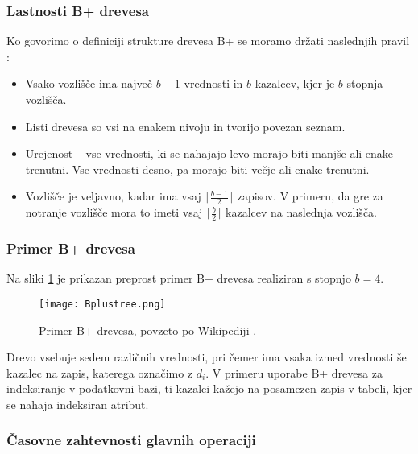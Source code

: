 \documentclass[a4paper,12pt,openright]{book}
\begin{document}
        \subsubsection{Lastnosti B+ drevesa}
        \label{btree_rules}
        Ko govorimo o definiciji strukture drevesa B+ se moramo držati naslednjih pravil \cite{goodrich2011data}:

        \begin{itemize}
            \item Vsako vozlišče ima največ $b - 1$ vrednosti in $b$ kazalcev, kjer je $b$ stopnja vozlišča.
            \item Listi drevesa so vsi na enakem nivoju in tvorijo povezan seznam.
            \item Urejenost – vse vrednosti, ki se nahajajo levo morajo biti manjše ali enake trenutni. Vse vrednosti desno, pa morajo biti večje ali enake trenutni.
            \item Vozlišče je veljavno, kadar ima vsaj $\lceil \frac{b - 1}{2}\rceil$ zapisov. V primeru, da gre za notranje vozlišče mora to imeti vsaj $\lceil \frac{b}{2} \rceil$ kazalcev na naslednja vozlišča.
        \end{itemize}
        
        \subsubsection{Primer B+ drevesa}
        Na sliki \ref{btree_example} je prikazan preprost primer B+ drevesa realiziran s stopnjo $b=4$.
        
        \begin{figure}[H]        
            \centerline{\texttt{[image: Bplustree.png]}}
            \caption{Primer B+ drevesa, povzeto po Wikipediji \cite{BPTREE}.}
            \label{btree_example}
        \end{figure}

        \noindent
        Drevo vsebuje sedem različnih vrednosti, pri čemer ima vsaka izmed vrednosti še kazalec na zapis, katerega označimo z $d_i$. V primeru uporabe B+ drevesa za indeksiranje v podatkovni bazi, ti kazalci kažejo na posamezen zapis v tabeli, kjer se nahaja indeksiran atribut.

        \subsubsection{Časovne zahtevnosti glavnih operaciji}
        
\end{document}
